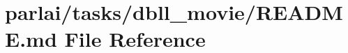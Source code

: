 \hypertarget{parlai_2tasks_2dbll__movie_2README_8md}{}\section{parlai/tasks/dbll\+\_\+movie/\+R\+E\+A\+D\+ME.md File Reference}
\label{parlai_2tasks_2dbll__movie_2README_8md}
